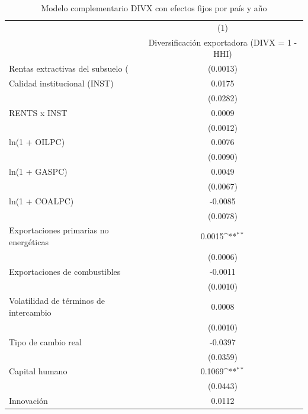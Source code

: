 \begin{table}[htbp]\centering
\def\sym#1{\ifmmode^{#1}\else\(^{#1}\)\fi}
\caption{Modelo complementario DIVX con efectos fijos por país y año}
\begin{tabular}{l*{1}{c}}
\toprule
                    &\multicolumn{1}{c}{(1)}\\
                    &\multicolumn{1}{c}{Diversificación exportadora (DIVX = 1 - HHI)}\\
\midrule
Rentas extractivas del subsuelo (%
                    &    (0.0013)         \\
\addlinespace
Calidad institucional (INST)&      0.0175         \\
                    &    (0.0282)         \\
\addlinespace
RENTS x INST        &      0.0009         \\
                    &    (0.0012)         \\
\addlinespace
ln(1 + OILPC)       &      0.0076         \\
                    &    (0.0090)         \\
\addlinespace
ln(1 + GASPC)       &      0.0049         \\
                    &    (0.0067)         \\
\addlinespace
ln(1 + COALPC)      &     -0.0085         \\
                    &    (0.0078)         \\
\addlinespace
Exportaciones primarias no energéticas&      0.0015\sym{**} \\
                    &    (0.0006)         \\
\addlinespace
Exportaciones de combustibles&     -0.0011         \\
                    &    (0.0010)         \\
\addlinespace
Volatilidad de términos de intercambio&      0.0008         \\
                    &    (0.0010)         \\
\addlinespace
Tipo de cambio real &     -0.0397         \\
                    &    (0.0359)         \\
\addlinespace
Capital humano      &      0.1069\sym{**} \\
                    &    (0.0443)         \\
\addlinespace
Innovación          &      0.0112         \\

\end{tabular}
\end{table}
